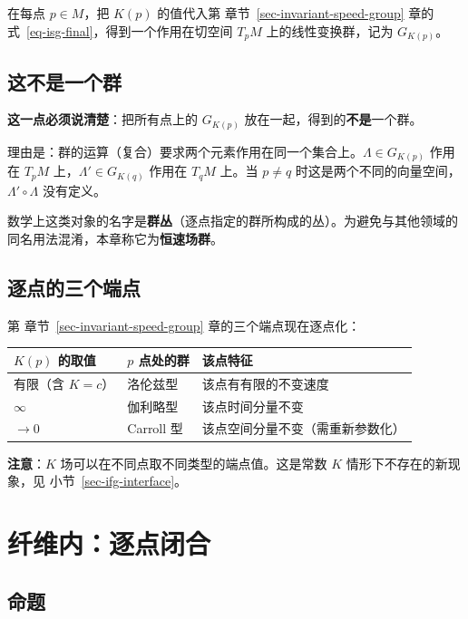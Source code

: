 \documentclass[
  chinese,
  a4paper,
  UTF8,
  12pt,
  oneside,
  openany]{ctexbook}
\newcounter{none} %
\theoremstyle{plain}
\theoremstyle{plain}
\theoremstyle{plain}
\theoremstyle{definition}
\theoremstyle{plain}
\theoremstyle{plain}
\theoremstyle{remark}
\begin{document}
在每点 \(p\in M\)，把 \(K(p)\) 的值代入第
章节~\ref{sec-invariant-speed-group} 章的
式~\ref{eq-isg-final}，得到一个作用在切空间 \(T_pM\)
上的线性变换群，记为 \(G_{K(p)}\)。

\subsection{这不是一个群}\label{ux8fd9ux4e0dux662fux4e00ux4e2aux7fa4}

\textbf{这一点必须说清楚}：把所有点上的 \(G_{K(p)}\)
放在一起，得到的\textbf{不是}一个群。

理由是：群的运算（复合）要求两个元素作用在同一个集合上。\(\Lambda\in G_{K(p)}\)
作用在 \(T_pM\) 上，\(\Lambda'\in G_{K(q)}\) 作用在 \(T_qM\) 上。当
\(p\neq q\) 时这是两个不同的向量空间，\(\Lambda'\circ\Lambda\)
没有定义。

数学上这类对象的名字是\textbf{群丛}（逐点指定的群所构成的丛）。为避免与其他领域的同名用法混淆，本章称它为\textbf{恒速场群}。

\subsection{逐点的三个端点}\label{ux9010ux70b9ux7684ux4e09ux4e2aux7aefux70b9}

第 章节~\ref{sec-invariant-speed-group} 章的三个端点现在逐点化：

{\def\LTcaptype{none} %
\begin{longtable}[]{@{}lll@{}}
\toprule\noalign{}
\(K(p)\) 的取值 & \(p\) 点处的群 & 该点特征 \\
\midrule\noalign{}
\endhead
\bottomrule\noalign{}
\endlastfoot
有限（含 \(K=c\)） & 洛伦兹型 & 该点有有限的不变速度 \\
\(\infty\) & 伽利略型 & 该点时间分量不变 \\
\(\to0\) & Carroll 型 & 该点空间分量不变（需重新参数化） \\
\end{longtable}
}

\textbf{注意}：\(K\) 场可以在不同点取不同类型的端点值。这是常数 \(K\)
情形下不存在的新现象，见 小节~\ref{sec-ifg-interface}。

\section{纤维内：逐点闭合}\label{sec-ifg-fiber}

\subsection{命题}\label{ux547dux9898}
\end{document}
